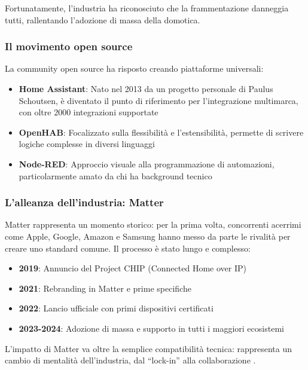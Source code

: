 Fortunatamente, l'industria ha riconosciuto che la frammentazione danneggia tutti, rallentando l'adozione di massa della domotica.

\subsubsection{Il movimento open source}

La community open source ha risposto creando piattaforme universali:

\begin{itemize}
    \item \textbf{Home Assistant}: Nato nel 2013 da un progetto personale di Paulus Schoutsen, è diventato il punto di riferimento per l'integrazione multimarca, con oltre 2000 integrazioni supportate
    \item \textbf{OpenHAB}: Focalizzato sulla flessibilità e l'estensibilità, permette di scrivere logiche complesse in diversi linguaggi
    \item \textbf{Node-RED}: Approccio visuale alla programmazione di automazioni, particolarmente amato da chi ha background tecnico
\end{itemize}

\subsubsection{L'alleanza dell'industria: Matter}

Matter rappresenta un momento storico: per la prima volta, concorrenti acerrimi come Apple, Google, Amazon e Samsung hanno messo da parte le rivalità per creare uno standard comune. Il processo è stato lungo e complesso:

\begin{itemize}
    \item \textbf{2019}: Annuncio del Project CHIP (Connected Home over IP)
    \item \textbf{2021}: Rebranding in Matter e prime specifiche
    \item \textbf{2022}: Lancio ufficiale con primi dispositivi certificati
    \item \textbf{2023-2024}: Adozione di massa e supporto in tutti i maggiori ecosistemi
\end{itemize}

L'impatto di Matter va oltre la semplice compatibilità tecnica: rappresenta un cambio di mentalità dell'industria, dal ``lock-in'' alla collaborazione \cite{ConnectivityStandardsAlliance2023}.

